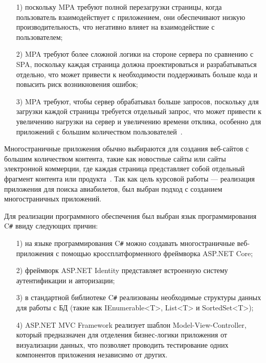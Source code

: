 \documentclass{bmstu}
\begin{document}
\begin{enumerate}
\item[1)] поскольку MPA требуют полной перезагрузки страницы, когда пользователь взаимодействует с приложением, они обеспечивают низкую производительность, что негативно влияет на взаимодействие с пользователем;
\item[2)] MPA требуют более сложной логики на стороне сервера по сравнению с SPA, поскольку каждая страница должна проектироваться и разрабатываться отдельно, что может привести к необходимости поддерживать больше кода и повысить риск возникновения ошибок;
\item[3)] MPA требуют, чтобы сервер обрабатывал больше запросов, поскольку для загрузки каждой страницы требуется отдельный запрос, что может привести к увеличению нагрузки на сервер и увеличению времени отклика, особенно для приложений с большим количеством пользователей~\cite{Davidson2023}.
\end{enumerate}

Многостраничные приложения обычно выбираются для создания веб-сайтов с большим количеством контента, такие как новостные сайты или сайты электронной коммерции, где каждая страница представляет собой отдельный фрагмент контента или продукта~\cite{Davidson2023}\cite{Tran2022}. 
Так как цель курсовой работы --- реализация приложения для поиска авиабилетов, был выбран подход с созданием многостраничных приложений.

Для реализации программного обеспечения был выбран язык программирования C\texttt{\#} ввиду следующих причин:

\begin{enumerate}
\item[1)] на языке программирования C\texttt{\#} можно создавать многостраничные веб-приложения с помощью кроссплатформенного фреймворка ASP.NET Core;
\item[2)] фреймворк ASP.NET Identity представляет встроенную систему аутентификации и авторизации;
\item[3)] в стандартной библиотеке C\texttt{\#} реализованы необходимые структуры данных для работы с БД (такие как IEnumerable<T>, List<T> и SortedSet<T>);
\item[4)] ASP.NET MVC Framework реализует шаблон Model-View-Controller, который предназначен для отделения бизнес-логики приложения от визуализации данных, что позволяет проводить тестирование одних компонентов приложения независимо от других.
\end{enumerate}
\end{document}
